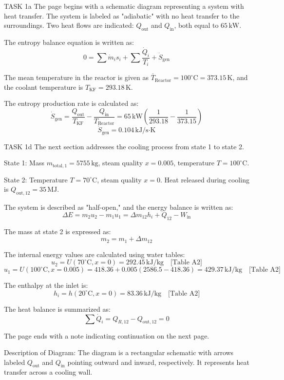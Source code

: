 TASK 1a  
The page begins with a schematic diagram representing a system with heat transfer. The system is labeled as "adiabatic" with no heat transfer to the surroundings. Two heat flows are indicated: \( Q_{\text{out}} \) and \( Q_{\text{in}} \), both equal to \( 65 \, \text{kW} \).  

The entropy balance equation is written as:  
\[
0 = \sum \dot{m}_i s_i + \sum \frac{\dot{Q}_i}{T_i} + \dot{S}_{\text{gen}}
\]  

The mean temperature in the reactor is given as \( \bar{T}_{\text{Reactor}} = 100^\circ\text{C} = 373.15 \, \text{K} \), and the coolant temperature is \( T_{\text{KF}} = 293.18 \, \text{K} \).  

The entropy production rate is calculated as:  
\[
\dot{S}_{\text{gen}} = \frac{Q_{\text{out}}}{T_{\text{KF}}} - \frac{Q_{\text{in}}}{T_{\text{Reactor}}} = 65 \, \text{kW} \left( \frac{1}{293.18} - \frac{1}{373.15} \right)
\]  
\[
\dot{S}_{\text{gen}} = 0.104 \, \text{kJ/s·K}
\]  

TASK 1d  
The next section addresses the cooling process from state 1 to state 2.  

State 1:  
Mass \( m_{\text{total},1} = 5755 \, \text{kg} \), steam quality \( x = 0.005 \), temperature \( T = 100^\circ\text{C} \).  

State 2:  
Temperature \( T = 70^\circ\text{C} \), steam quality \( x = 0 \). Heat released during cooling is \( Q_{\text{out},12} = 35 \, \text{MJ} \).  

The system is described as "half-open," and the energy balance is written as:  
\[
\Delta E = m_2 u_2 - m_1 u_1 = \Delta m_{12} h_i + Q_{12} - W_{\text{in}}
\]  

The mass at state 2 is expressed as:  
\[
m_2 = m_1 + \Delta m_{12}
\]  

The internal energy values are calculated using water tables:  
\[
u_2 = U(70^\circ\text{C}, x = 0) = 292.45 \, \text{kJ/kg} \quad \text{[Table A2]}
\]  
\[
u_1 = U(100^\circ\text{C}, x = 0.005) = 418.36 + 0.005 (2586.5 - 418.36) = 429.37 \, \text{kJ/kg} \quad \text{[Table A2]}
\]  

The enthalpy at the inlet is:  
\[
h_i = h(20^\circ\text{C}, x = 0) = 83.36 \, \text{kJ/kg} \quad \text{[Table A2]}
\]  

The heat balance is summarized as:  
\[
\sum \dot{Q}_i = Q_{R,12} - Q_{\text{out},12} = 0
\]  

The page ends with a note indicating continuation on the next page.  

Description of Diagram:  
The diagram is a rectangular schematic with arrows labeled \( Q_{\text{out}} \) and \( Q_{\text{in}} \) pointing outward and inward, respectively. It represents heat transfer across a cooling wall.